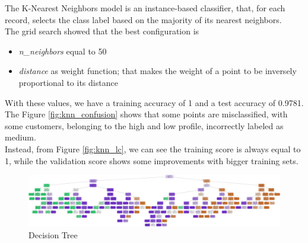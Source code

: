 The K-Nearest Neighbors model is an instance-based classifier, that, for each record, selects the class label based on the majority of its nearest neighbors.\\
The grid search showed that the best configuration is
\begin{itemize}
\item \emph{n\_neighbors} equal to 50
\item \emph{distance} as weight function; that makes the weight of a point to be inversely proportional to its distance
\end{itemize}

With these values, we have a training accuracy of 1 and a test accuracy of 0.9781.
The Figure \ref{fig:knn_confusion} shows that some points are misclassified, with some customers, belonging to the high and low profile, incorrectly labeled as medium.\\
Instead, from Figure \ref{fig:knn_lc}, we can see the training score is always equal to 1, while the validation score shows some improvements with bigger training sets.

\vspace{13mm}
\begin{figure}
\centering
\includegraphics[width=\linewidth]{img/classification/decision_tree.png}
\caption{Decision Tree}
\label{fig:decision_tree}
\end{figure}

\pagebreak
